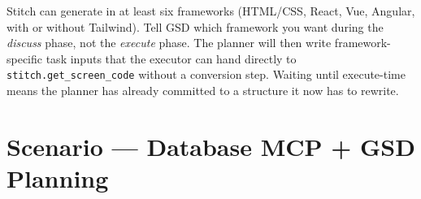 \documentclass[11pt,letterpaper,openany]{book}
\begin{document}
\begin{gsdtip}
Stitch can generate in at least six frameworks (HTML/CSS, React,
Vue, Angular, with or without Tailwind). Tell GSD which framework
you want during the \emph{discuss} phase, not the \emph{execute}
phase. The planner will then write framework-specific task inputs
that the executor can hand directly to \texttt{stitch.get\_screen\_code}
without a conversion step. Waiting until execute-time means the
planner has already committed to a structure it now has to rewrite.
\end{gsdtip}

\chapter{Scenario --- Database MCP + GSD Planning}
\end{document}
